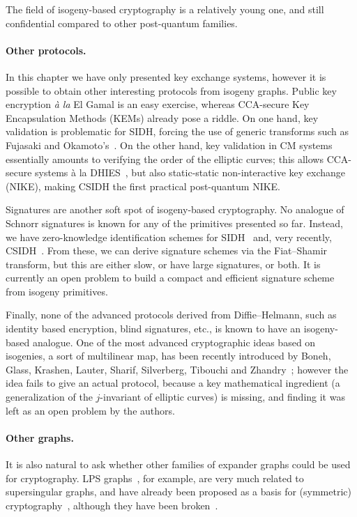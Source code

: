 \documentclass{report}
\theoremstyle{plain}
\theoremstyle{definition}
\begin{document}
The field of isogeny-based cryptography is a relatively young one, and
still confidential compared to other post-quantum families. %

\paragraph{Other protocols.}
In this chapter we have only presented key exchange systems, however
it is possible to obtain other interesting protocols from isogeny
graphs. %
Public key encryption \emph{à la} El Gamal is an easy exercise,
whereas CCA-secure Key Encapsulation Methods (KEMs) already pose a
riddle. %
On one hand, key validation is problematic for SIDH, forcing the use
of generic transforms such as Fujasaki and
Okamoto's~\cite{10.1007/3-540-48405-1_34}. %
On the other hand, key validation in CM systems essentially amounts to
verifying the order of the elliptic curves; this allows CCA-secure
systems à la
DHIES~\cite{cryptoeprint:1999:007,10.1007/3-540-45353-9_12,doi:10.1137/S0097539702403773},
but also static-static non-interactive key exchange (NIKE), making
CSIDH the first practical post-quantum NIKE. %

Signatures are another soft spot of isogeny-based cryptography. %
No analogue of Schnorr signatures is known for any of the primitives
presented so far. %
Instead, we have zero-knowledge identification schemes for
SIDH~\cite{defeo+jao+plut12,cryptoeprint:2017:186,cryptoeprint:2016:1154}
and, very recently, CSIDH~\cite{cryptoeprint:2018:824}. %
From these, we can derive signature schemes via the Fiat--Shamir
transform, but this are either slow, or have large signatures, or
both. %
It is currently an open problem to build a compact and efficient
signature scheme from isogeny primitives. %

Finally, none of the advanced protocols derived from Diffie--Helmann,
such as identity based encryption, blind signatures, etc., is known to
have an isogeny-based analogue. %
One of the most advanced cryptographic ideas based on isogenies, a
sort of multilinear map, has been recently introduced by Boneh, Glass,
Krashen, Lauter, Sharif, Silverberg, Tibouchi and
Zhandry~\cite{Boneh2018}; however the idea fails to give an actual
protocol, because a key mathematical ingredient (a generalization of
the $j$-invariant of elliptic curves) is missing, and finding it was
left as an open problem by the authors.

\paragraph{Other graphs.}
It is also natural to ask whether other families of expander graphs
could be used for cryptography. %
LPS graphs~\cite{LubPS}, for example, are very much related to
supersingular graphs, and have already been proposed as a basis for
(symmetric) cryptography~\cite{charles+lauter+goren09}, although they
have been broken~\cite{tillich2008collisions,quis}. %
\end{document}
